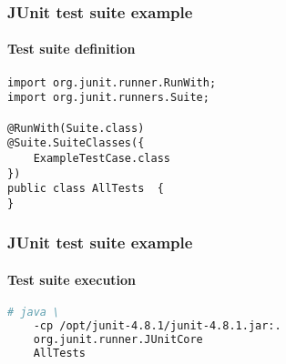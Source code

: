 \begin{frame}[fragile, hasprev=false, hasnext=true]
\frametitle{JUnit test suite example}
\framesubtitle{Test suite definition}
\label{example:junit-test-suite}

\begin{lstlisting}
import org.junit.runner.RunWith;
import org.junit.runners.Suite;

@RunWith(Suite.class)
@Suite.SuiteClasses({
    ExampleTestCase.class
})
public class AllTests  {
}
\end{lstlisting}
\end{frame}


\begin{frame}[fragile, hasprev=true, hasnext=false]
\frametitle{JUnit test suite example}
\framesubtitle{Test suite execution}

\begin{lstlisting}[language=bash]
# java \
	-cp /opt/junit-4.8.1/junit-4.8.1.jar:.
	org.junit.runner.JUnitCore
	AllTests
\end{lstlisting}

\end{frame}

